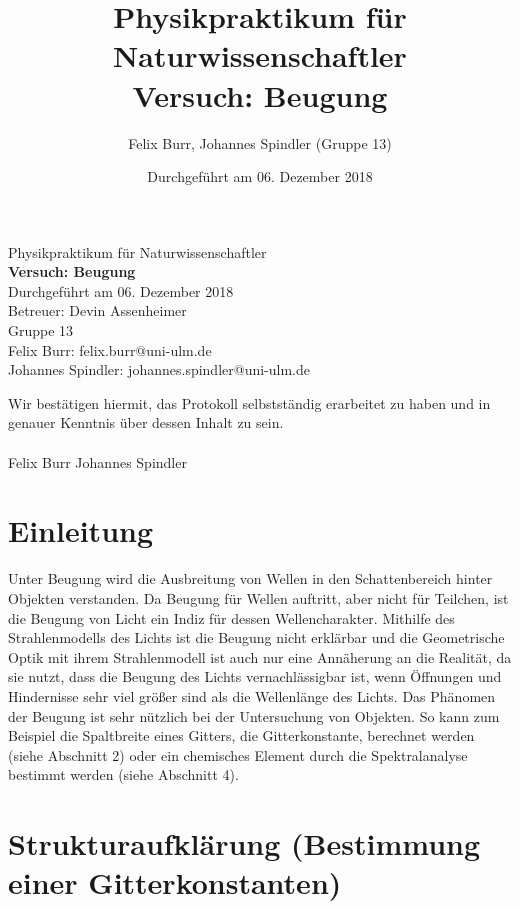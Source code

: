 \documentclass{scrartcl}
\title{Physikpraktikum für Naturwissenschaftler \\ Versuch: Beugung}
\author{Felix Burr, Johannes Spindler (Gruppe 13)}
\date{Durchgeführt am 06. Dezember 2018}
\begin{document}
\begin{titlepage}
  \begin{center}
    \vspace*{1cm}
    \LARGE
    Physikpraktikum für Naturwissenschaftler \\
    \vspace*{1cm}
    \Huge
    \textbf{Versuch: Beugung} \\
    \vspace*{0.3cm}
    \Large
    Durchgeführt am 06. Dezember 2018 \\
    Betreuer: Devin Assenheimer \\
    \vspace*{2.5cm}
    Gruppe 13 \\
    Felix Burr: felix.burr@uni-ulm.de \\
    Johannes Spindler: johannes.spindler@uni-ulm.de \\
    \vfill 
  \end{center}
  Wir bestätigen hiermit, das Protokoll selbstständig erarbeitet zu haben und in genauer Kenntnis über dessen Inhalt zu sein. \\
  \vspace*{0.8cm}
  \\
  Felix Burr
  \hfill
  Johannes Spindler
\end{titlepage}
\pagebreak
\tableofcontents


\pagebreak

\section{Einleitung}
Unter Beugung wird die Ausbreitung von Wellen in den Schattenbereich hinter Objekten verstanden. Da Beugung für Wellen auftritt, aber nicht für Teilchen, ist die Beugung von Licht ein Indiz für dessen Wellencharakter. Mithilfe des Strahlenmodells des Lichts ist die Beugung nicht erklärbar und die Geometrische Optik mit ihrem Strahlenmodell ist auch nur eine Annäherung an die Realität, da sie nutzt, dass die Beugung des Lichts vernachlässigbar ist, wenn Öffnungen und Hindernisse sehr viel größer sind als die Wellenlänge des Lichts. Das Phänomen der Beugung ist sehr nützlich bei der Untersuchung von Objekten. So kann zum Beispiel die Spaltbreite eines Gitters, die Gitterkonstante, berechnet werden (siehe Abschnitt 2) oder ein chemisches Element durch die Spektralanalyse bestimmt werden (siehe Abschnitt 4).

\section{Strukturaufklärung (Bestimmung einer Gitterkonstanten)}
\end{document}
